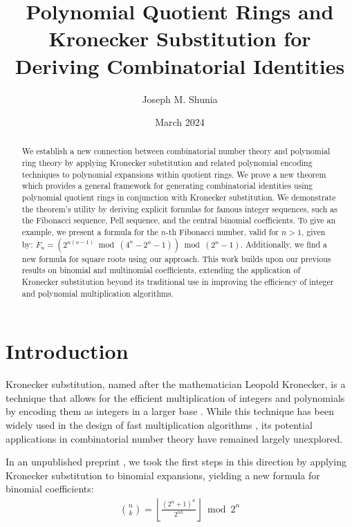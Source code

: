 \documentclass[11pt,reqno]{article}
\theoremstyle{plain}
\theoremstyle{definition}
\newcommand{\floor}[1]{\left\lfloor #1 \right\rfloor}
\begin{document}
\title{Polynomial Quotient Rings and Kronecker Substitution for Deriving Combinatorial Identities}
\author{Joseph M. Shunia}
\date{March 2024}

\maketitle

\begin{abstract}
We establish a new connection between combinatorial number theory and polynomial ring theory by applying Kronecker substitution and related polynomial encoding techniques to polynomial expansions within quotient rings. We prove a new theorem which provides a general framework for generating combinatorial identities using polynomial quotient rings in conjunction with Kronecker substitution. We demonstrate the theorem's utility by deriving explicit formulas for famous integer sequences, such as the Fibonacci sequence, Pell sequence, and the central binomial coefficients. To give an example, we present a formula for the $n$-th Fibonacci number, valid for $n > 1$, given by: $F_n = (2^{n (n - 1)} \bmod{(4^n-2^n-1)}) \bmod{(2^n-1)}$. Additionally, we find a new formula for square roots using our approach. This work builds upon our previous results on binomial and multinomial coefficients, extending the application of Kronecker substitution beyond its traditional use in improving the efficiency of integer and polynomial multiplication algorithms.
\end{abstract}

\section{Introduction}
Kronecker substitution, named after the mathematician Leopold Kronecker, is a technique that allows for the efficient multiplication of integers and polynomials by encoding them as integers in a larger base \cite{kronecker1882}. While this technique has been widely used in the design of fast multiplication algorithms \cite{harvey2009kronecker, harvey2014faster, albrecht2018implementing, bos2020postquantum, greuet2022modular}, its potential applications in combinatorial number theory have remained largely unexplored.

In an unpublished preprint \cite{shunia2023simple}, we took the first steps in this direction by applying Kronecker substitution to binomial expansions, yielding a new formula for binomial coefficients:
\begin{align*}
    \binom{n}{k} = \floor{\frac{(2^n+1)^n}{2^{n k}}} \bmod{2^n}
\end{align*}
\end{document}
